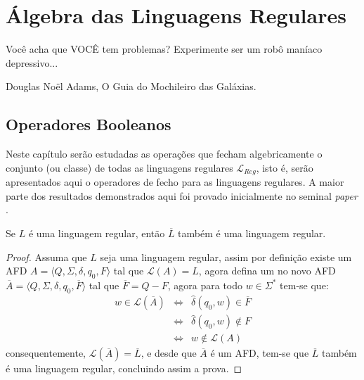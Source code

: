\chapter{Álgebra das Linguagens Regulares}\label{cap:AlgebrasRegulares}



\epigraph{Você acha que VOCÊ tem problemas? Experimente ser um robô maníaco depressivo...}{Douglas Noël Adams, O Guia do Mochileiro das Galáxias.}

\section{Operadores Booleanos}

Neste capítulo serão estudadas  as operações que fecham algebricamente o conjunto (ou classe) de todas as linguagens regulares $\mathcal{L}_{Reg}$, isto é, serão apresentados aqui o operadores de fecho para as linguagens regulares. A maior parte dos resultados demonstrados aqui foi provado inicialmente no seminal \textit{paper} \cite{rabin1959}.

\begin{theorem}\label{teo:FechoComplementoRegular}
	Se $L$ é uma linguagem regular, então $\overline{L}$ também é uma linguagem regular.
\end{theorem}

\begin{proof}
	Assuma que $L$ seja uma linguagem regular, assim por definição existe um AFD $A = \langle Q, \Sigma, \delta, q_0, F\rangle$ tal que $\mathcal{L}(A) = L$, agora defina um no novo AFD $\overline{A} = \langle Q, \Sigma, \delta, q_0, \overline{F} \rangle$ tal que $\overline{F} = Q - F$, agora para todo $w \in \Sigma^*$ tem-se que:
	\begin{eqnarray*}
		w \in \mathcal{L}(\overline{A}) & \Longleftrightarrow & \widehat{\delta}(q_0, w) \in \overline{F}\\
		& \Longleftrightarrow & \widehat{\delta}(q_0, w) \notin F\\
		& \Longleftrightarrow & w \notin \mathcal{L}(A)
	\end{eqnarray*}
	consequentemente, $\mathcal{L}(\overline{A}) = \overline{L}$, e desde que $\overline{A}$ é um AFD, tem-se que $\overline{L}$ também é uma linguagem regular, concluindo assim a prova.
\end{proof}


